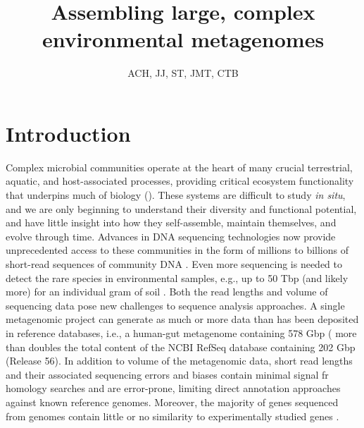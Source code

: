 \documentclass[11pt]{article} %
\begin{document}
\title{Assembling large, complex environmental metagenomes}
\author{ACH, JJ, ST, JMT, CTB} 
\maketitle

\section{Introduction}  
Complex microbial communities operate at the heart of many crucial
terrestrial, aquatic, and host-associated processes, providing
critical ecosystem functionality that underpins much of biology
(\cite{Arumugam:2011p735,Hess:2011p686,Iverson:2012p1281,
  Mackelprang:2011p1087,Qin:2010p189,Tringe:2005p174,Venter:2004p170}).
These systems are difficult to study {\em in situ}, and we are only
beginning to understand their diversity and functional potential, and
have little insight into how they self-assemble, maintain themselves,
and evolve through time.  Advances in DNA sequencing technologies now
provide unprecedented access to these communities in the form of
millions to billions of short-read sequences of community DNA
\cite{Hess:2011p686,Mackelprang:2011p1087,Qin:2010p189}.  Even more
sequencing is needed to detect the rare species in environmental
samples, e.g., up to 50 Tbp (and likely more) for an individual gram
of soil \cite{Gans:2005p1365}.  Both the read lengths and volume of
sequencing data pose new challenges to sequence analysis approaches.
A single metagenomic project can generate as much or more data than
has been deposited in reference databases, i.e., a human-gut
metagenome containing 578 Gbp (\cite{Qin:2010p189} more than doubles
the total content of the NCBI RefSeq database containing 202 Gbp
(Release 56).  In addition to volume of the metagenomic data, short
read lengths and their associated sequencing errors and biases contain
minimal signal fr homology searches and are error-prone, limiting
direct annotation approaches against known reference genomes.  Moreover,
the majority of genes sequenced from genomes contain little or no similarity
to experimentally studied genes
\cite{Arumugam:2011p735,Qin:2010p189}.
\end{document}
